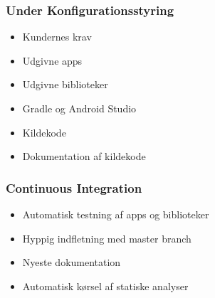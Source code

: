 \begin{frame}
    \frametitle{Under Konfigurationsstyring}
    \begin{itemize}
      \item Kundernes krav
      \item Udgivne apps
      \item Udgivne biblioteker
      \item Gradle og Android Studio
      \item Kildekode
      \item Dokumentation af kildekode
    \end{itemize}
\end{frame}

\begin{frame}
    \frametitle{Continuous Integration}
    \begin{itemize}
      \item Automatisk testning af apps og biblioteker
      \item Hyppig indfletning med master branch
      \item Nyeste dokumentation
      \item Automatisk kørsel af statiske analyser
    \end{itemize}
\end{frame}
